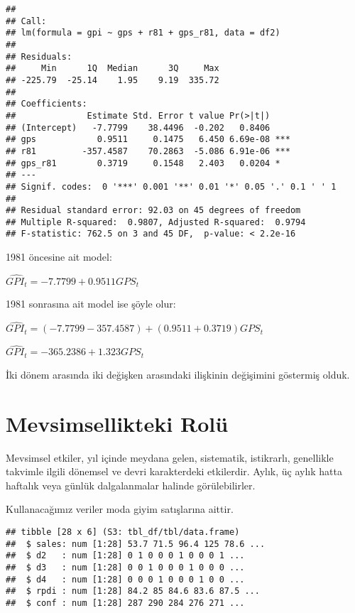 \documentclass[
]{book}
\newenvironment{Shaded}{\begin{snugshade}}{\end{snugshade}}
\newcommand{\KeywordTok}[1]{\textcolor[rgb]{0.13,0.29,0.53}{\textbf{#1}}}
\newcommand{\NormalTok}[1]{#1}
\newcommand{\OperatorTok}[1]{\textcolor[rgb]{0.81,0.36,0.00}{\textbf{#1}}}
\newcommand{\StringTok}[1]{\textcolor[rgb]{0.31,0.60,0.02}{#1}}
\begin{document}
\begin{verbatim}
## 
## Call:
## lm(formula = gpi ~ gps + r81 + gps_r81, data = df2)
## 
## Residuals:
##     Min      1Q  Median      3Q     Max 
## -225.79  -25.14    1.95    9.19  335.72 
## 
## Coefficients:
##              Estimate Std. Error t value Pr(>|t|)    
## (Intercept)   -7.7799    38.4496  -0.202   0.8406    
## gps            0.9511     0.1475   6.450 6.69e-08 ***
## r81         -357.4587    70.2863  -5.086 6.91e-06 ***
## gps_r81        0.3719     0.1548   2.403   0.0204 *  
## ---
## Signif. codes:  0 '***' 0.001 '**' 0.01 '*' 0.05 '.' 0.1 ' ' 1
## 
## Residual standard error: 92.03 on 45 degrees of freedom
## Multiple R-squared:  0.9807, Adjusted R-squared:  0.9794 
## F-statistic: 762.5 on 3 and 45 DF,  p-value: < 2.2e-16
\end{verbatim}

1981 öncesine ait model:

\(\hat{GPI_t} = -7.7799 + 0.9511GPS_t\)

1981 sonrasına ait model ise şöyle olur:

\(\hat{GPI_t} = (-7.7799 - 357.4587) + (0.9511 + 0.3719)GPS_t\)

\(\hat{GPI_t} = -365.2386 + 1.323GPS_t\)

İki dönem arasında iki değişken arasındaki ilişkinin değişimini göstermiş olduk.

\hypertarget{mevsimsellikteki-roluxfc}{%
\section{Mevsimsellikteki Rolü}\label{mevsimsellikteki-roluxfc}}

Mevsimsel etkiler, yıl içinde meydana gelen, sistematik, istikrarlı, genellikle takvimle ilgili dönemsel ve devri karakterdeki etkilerdir. Aylık, üç aylık hatta haftalık veya günlük dalgalanmalar halinde görülebilirler.

Kullanacağımız veriler moda giyim satışlarına aittir.

\begin{Shaded}
\end{Shaded}

\begin{verbatim}
## tibble [28 x 6] (S3: tbl_df/tbl/data.frame)
##  $ sales: num [1:28] 53.7 71.5 96.4 125 78.6 ...
##  $ d2   : num [1:28] 0 1 0 0 0 1 0 0 0 1 ...
##  $ d3   : num [1:28] 0 0 1 0 0 0 1 0 0 0 ...
##  $ d4   : num [1:28] 0 0 0 1 0 0 0 1 0 0 ...
##  $ rpdi : num [1:28] 84.2 85 84.6 83.6 87.5 ...
##  $ conf : num [1:28] 287 290 284 276 271 ...
\end{verbatim}
\end{document}
